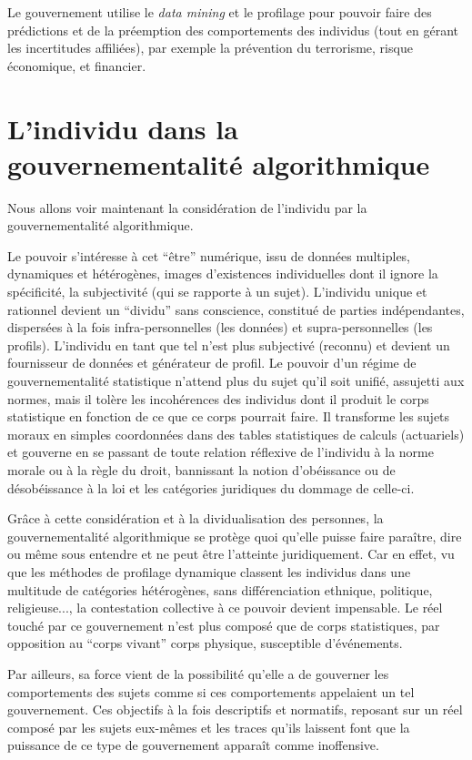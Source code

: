 \documentclass[a4paper,12pt]{report}
\begin{document}
Le gouvernement utilise le \textit{data mining} et le profilage pour pouvoir faire des prédictions et de la préemption des comportements des individus (tout en gérant les incertitudes affiliées), par exemple la prévention du terrorisme, risque économique, et financier.

\section{L'individu dans la gouvernementalité algorithmique}

Nous allons voir maintenant la considération de l'individu par la gouvernementalité algorithmique. 

Le pouvoir s'intéresse à cet ``être'' numérique, issu de données multiples, dynamiques et hétérogènes, images d'existences individuelles dont il ignore la spécificité, la subjectivité (qui se rapporte à un sujet).
L'individu unique et rationnel devient un ``dividu'' sans conscience, constitué de parties indépendantes, dispersées à la fois infra-personnelles (les données) et supra-personnelles (les profils). L'individu en tant que tel n'est plus subjectivé (reconnu) et devient un fournisseur de données et générateur de profil.
Le pouvoir d'un régime de gouvernementalité statistique n'attend plus du sujet qu'il soit unifié, assujetti aux normes, mais il tolère les incohérences des individus dont il produit le corps statistique en fonction de ce que ce corps pourrait faire. Il transforme les sujets moraux en simples coordonnées dans des tables statistiques de calculs (actuariels) et gouverne en se passant de toute relation réflexive de l'individu à la norme morale ou à la règle du droit, bannissant la notion d'obéissance ou de désobéissance à la loi et les catégories juridiques du dommage de celle-ci.

Grâce à cette considération et à la dividualisation des personnes, la gouvernementalité algorithmique se protège quoi qu'elle puisse faire paraître, dire ou même sous entendre et ne peut être l'atteinte juridiquement. Car en effet, vu que les méthodes de profilage dynamique classent les individus dans une multitude de catégories hétérogènes, sans différenciation ethnique, politique, religieuse..., la contestation collective à ce pouvoir devient impensable. Le réel touché par ce gouvernement n'est plus composé que de corps statistiques, par opposition au ``corps vivant'' corps physique, susceptible d'événements.

Par ailleurs, sa force vient de la possibilité qu'elle a de gouverner les comportements des sujets comme si ces comportements appelaient un tel gouvernement. Ces objectifs à la fois descriptifs et normatifs, reposant sur un réel composé par les sujets eux-mêmes et les traces qu'ils laissent font que la puissance de ce type de gouvernement apparaît comme inoffensive.
\end{document}
